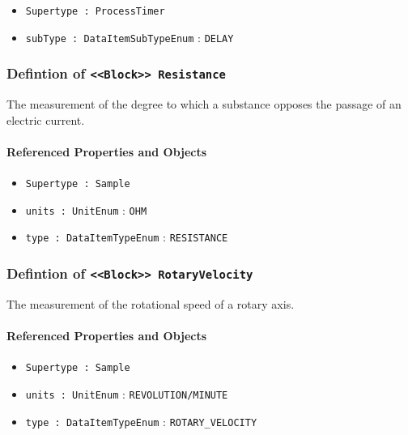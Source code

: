 \begin{itemize}
\item \texttt{Supertype : ProcessTimer}

\item \texttt{subType : DataItemSubTypeEnum} : \texttt{DELAY}

\end{itemize}
\FloatBarrier
\subsubsection{Defintion of \texttt{<<Block>> Resistance}}
  \label{type:Resistance}

\FloatBarrier

The measurement of the degree to which a substance opposes the passage of an electric current.

\FloatBarrier
\paragraph{Referenced Properties and Objects}

\begin{itemize}
\item \texttt{Supertype : Sample}

\item \texttt{units : UnitEnum} : \texttt{OHM}

\item \texttt{type : DataItemTypeEnum} : \texttt{RESISTANCE}

\end{itemize}
\FloatBarrier
\subsubsection{Defintion of \texttt{<<Block>> RotaryVelocity}}
  \label{type:RotaryVelocity}

\FloatBarrier

The measurement of the rotational speed of a rotary axis.

\FloatBarrier
\paragraph{Referenced Properties and Objects}

\begin{itemize}
\item \texttt{Supertype : Sample}

\item \texttt{units : UnitEnum} : \texttt{REVOLUTION/MINUTE}

\item \texttt{type : DataItemTypeEnum} : \texttt{ROTARY_VELOCITY}

\end{itemize}
\FloatBarrier
